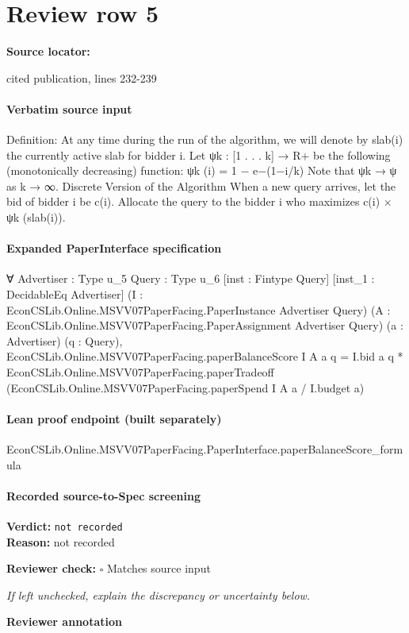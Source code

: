\documentclass[10pt]{article}
\newcommand{\reviewerbox}{%
  \par\noindent\fbox{\parbox{0.96\linewidth}{\rule{0pt}{0.38in}}}\par
}
\newcommand{\reviewmatch}[1]{%
  \par\noindent\textbf{Reviewer check:} $\square$\; #1\par
  \noindent\emph{If left unchecked, explain the discrepancy or uncertainty below.}\par
}
\begin{document}
\section*{Review row 5}
\textbf{Source locator:} {\footnotesize\raggedright cited publication, lines 232-\allowbreak{}239\par}
\paragraph{Verbatim source input}
\begin{ReviewVerbatim}
Definition: At any time during the run of the algorithm, we will denote by slab(i) the
currently active slab for bidder i.
Let ψk : [1 . . . k] → R+ be the following (monotonically decreasing) function:
ψk (i) = 1 − e−(1−i/k)
Note that ψk → ψ as k → ∞.
Discrete Version of the Algorithm
When a new query arrives, let the bid of bidder i be c(i). Allocate the query to the
bidder i who maximizes c(i) × ψk (slab(i)).
\end{ReviewVerbatim}


\paragraph{Expanded PaperInterface specification}
\begin{ReviewVerbatim}
∀ {Advertiser : Type u_5} {Query : Type u_6} [inst : Fintype Query] [inst_1 : DecidableEq Advertiser]
  (I : EconCSLib.Online.MSVV07PaperFacing.PaperInstance Advertiser Query)
  (A : EconCSLib.Online.MSVV07PaperFacing.PaperAssignment Advertiser Query) (a : Advertiser) (q : Query),
  EconCSLib.Online.MSVV07PaperFacing.paperBalanceScore I A a q =
    I.bid a q *
      EconCSLib.Online.MSVV07PaperFacing.paperTradeoff
        (EconCSLib.Online.MSVV07PaperFacing.paperSpend I A a / I.budget a)
\end{ReviewVerbatim}

\paragraph{Lean proof endpoint (built separately)}\begin{ReviewVerbatim}
EconCSLib.Online.MSVV07PaperFacing.PaperInterface.paperBalanceScore_formula
\end{ReviewVerbatim}

\paragraph{Recorded source-to-Spec screening}
\textbf{Verdict:} \texttt{not recorded}
\\
\textbf{Reason:} not recorded
\reviewmatch{Matches source input}
\noindent\textbf{Reviewer annotation}\par
\reviewerbox
\clearpage
\hypertarget{source-claim-76a2a932288dd83e}{}
\end{document}
